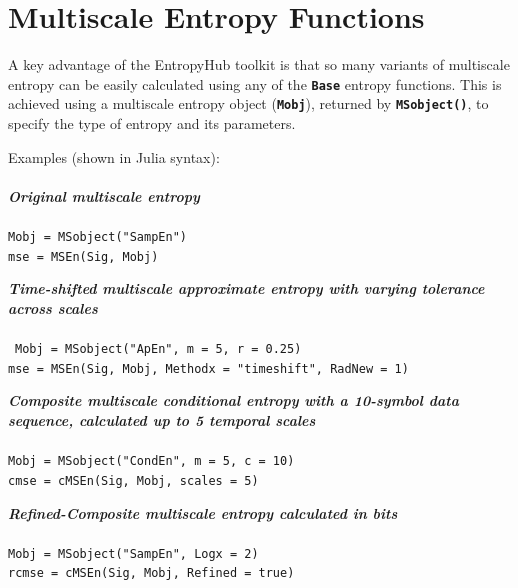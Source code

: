 \documentclass[12pt, a4paper, titlepage, openany]{book}
\begin{document}
\section{Multiscale Entropy Functions}
\vspace{3em}

A key advantage of the EntropyHub toolkit is that so many variants of multiscale entropy can be easily
calculated using any of the \texttt{\textbf{Base}} entropy functions.  This is achieved using a multiscale entropy object (\texttt{\textbf{Mobj}}), returned by \texttt{\textbf{MSobject()}}, to specify the type of entropy and its parameters.
\begin{center}
\end{center}
 
\noindent Examples (shown in Julia syntax)$\colon$ \footnotesize
\\ \ \\ \noindent \emph{\textbf{Original multiscale entropy}} \cite{MS1}
\\ \ \\ \indent \texttt{Mobj = MSobject("SampEn") \\
\indent mse = MSEn(Sig, Mobj)}

\noindent \emph{\textbf{Time-shifted multiscale approximate entropy with varying tolerance across scales}} \cite{MS2} \\
\\ \ \indent \texttt{Mobj = MSobject("ApEn", m = 5, r = 0.25)\\
\indent mse = MSEn(Sig, Mobj, Methodx = "timeshift", RadNew = 1)}

\noindent \emph{\textbf{Composite multiscale conditional entropy with a 10-symbol data sequence, calculated up to 5 temporal scales}} \cite{cMS1}
\\ \ \\ \indent \texttt{Mobj = MSobject("CondEn", m = 5, c = 10)\\
\indent cmse = cMSEn(Sig, Mobj, scales = 5)}

\noindent \emph{\textbf{Refined-Composite multiscale entropy calculated in bits}} \cite{cMS2}
\\ \ \\ \indent \texttt{Mobj = MSobject("SampEn", Logx = 2)\\
\indent rcmse = cMSEn(Sig, Mobj, Refined = true)}
\end{document}

